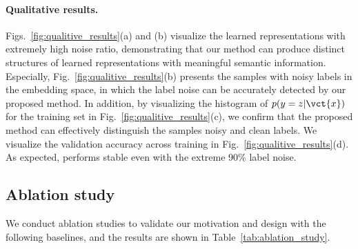 \paragraph{Qualitative results.} Figs.~\ref{fig:qualitive_results}(a) and (b) visualize the learned representations with extremely high noise ratio, demonstrating that our method can produce distinct structures of learned representations with meaningful semantic information. Especially, Fig.~\ref{fig:qualitive_results}(b) presents the samples with noisy labels in the embedding space, in which the label noise can be accurately detected by our proposed method. In addition, by visualizing the histogram of $p(y=z|\vct{x})$ for the training set in Fig.~\ref{fig:qualitive_results}(c), we confirm that the proposed method can effectively distinguish the samples noisy and clean labels.
We visualize the validation accuracy across training in Fig.~\ref{fig:qualitive_results}(d). As expected, \methodname performs stable even with the extreme 90\% label noise.

\subsection{Ablation study}

We conduct ablation studies to validate our motivation and design with the following baselines, and the results are shown in Table~\ref{tab:ablation_study}.

